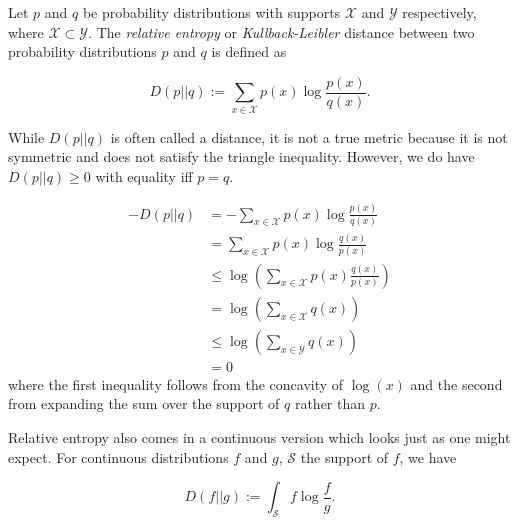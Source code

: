 \documentclass[12pt]{article}
\newcommand{\defined}{:=}
\begin{document}
Let $p$ and $q$ be probability distributions with supports $\mathcal{X}$ and $\mathcal{Y}$ respectively, where  $ \mathcal{X} \subset \mathcal{Y}$.  The \emph{relative entropy} or \emph{Kullback-Leibler} distance between two probability distributions $p$ and $q$ is defined as

\begin{equation}
D(p||q) \defined \sum_{x \in \mathcal{X}} p(x) \log \frac{p(x)}{q(x)}.
\end{equation}

While $D(p||q)$ is often called a distance, it is not a true metric because it is not symmetric and does not satisfy the triangle inequality.  However, we do have $D(p||q) \ge 0$ with equality iff $p = q$.

\begin{align}
-D(p||q) &= -\sum_{x \in \mathcal{X}} p(x) \log \frac{p(x)}{q(x)}\\
 &= \sum_{x \in \mathcal{X}} p(x) \log \frac{q(x)}{p(x)}\\
 &\le \log \left(\sum_{x \in \mathcal{X}} p(x) \frac{q(x)}{p(x)} \right)\\
 &= \log \left(\sum_{x \in \mathcal{X}} q(x) \right)\\
 &\le \log \left(\sum_{x \in \mathcal{Y}} q(x) \right)\\
 &= 0
\end{align}
where the first inequality follows from the concavity of $\log(x)$ and the second from expanding the sum over the support of $q$ rather than $p$.

Relative entropy also comes in a continuous version which looks just as one might expect.  For continuous distributions $f$ and $g$, $\mathcal{S}$ the support of $f$, we have

\begin{equation}
D(f||g) \defined \int_{\mathcal{S}} f \log \frac{f}{g}.
\end{equation}
\end{document}
